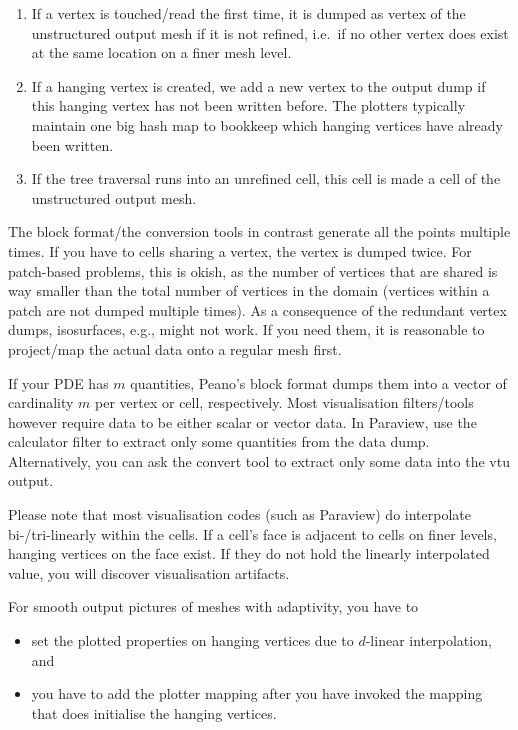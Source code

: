 \begin{enumerate}
  \item If a vertex is touched/read the first time, it is dumped as vertex of
  the unstructured output mesh if it is not refined, i.e.~if no other vertex
  does exist at the same location on a finer mesh level.
  \item If a hanging vertex is created, we add a new vertex to the output dump
  if this hanging vertex has not been written before. The plotters typically
  maintain one big hash map to bookkeep which hanging vertices have already been
  written.
  \item If the tree traversal runs into an unrefined cell, this cell is made a
  cell of the unstructured output mesh.
\end{enumerate}


The block format/the conversion tools in contrast generate all the points
multiple times.
If you have to cells sharing a vertex, the vertex is dumped twice.
For patch-based problems, this is okish, as the number of vertices that are
shared is way smaller than the total number of vertices in the domain (vertices
within a patch are not dumped multiple times).
As a consequence of the redundant vertex dumps, isosurfaces, e.g., might not
work.
If you need them, it is reasonable to project/map the actual data onto a regular
mesh first.


If your PDE has $m$ quantities, Peano's block format dumps them into a vector of
cardinality $m$ per vertex or cell, respectively. 
Most visualisation filters/tools however require data to be either scalar or 
vector data. 
In Paraview, use the calculator filter to extract only some quantities from the 
data dump.
Alternatively, you can ask the convert tool to extract only some data into the
vtu output.

\noindent
Please note that most visualisation codes (such as Paraview) do interpolate
bi-/tri-linearly within the cells. 
If a cell's face is adjacent to cells on finer levels, hanging vertices on the
face exist.
If they do not hold the linearly interpolated value, you will discover
visualisation artifacts.

\begin{remark}
  For smooth output pictures of meshes with adaptivity, you have to 
  \begin{itemize}
    \item set the plotted properties on hanging vertices due to $d$-linear
    interpolation, and
    \item you have to add the plotter mapping after you have invoked the mapping
    that does initialise the hanging vertices.
  \end{itemize}
\end{remark}



